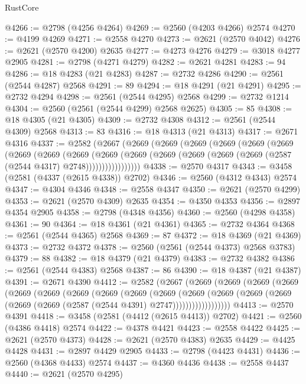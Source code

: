 \begin{lexlean}{RustCore}
\begin{coremodule}
@4266 := @2798 (@4256 @4264)
@4269 := @2560 (@4203 @4266) @2574
@4270 := @4199 @4269
@4271 := @2558 @4270
@4273 := @2621 (@2570 @4042)
@4276 := @2621 (@2570 @4200) @2635
@4277 := @4273 @4276
@4279 := @3018 @4277 @2905
@4281 := @2798 (@4271 @4279)
@4282 := @2621 @4281
@4283 := 94
@4286 := @18 @4283 (@21 @4283)
@4287 := @2732 @4286
@4290 := @2561 (@2544 @4287) @2568
@4291 := 89
@4294 := @18 @4291 (@21 @4291)
@4295 := @2732 @4294
@4298 := @2561 (@2544 @4295) @2568
@4299 := @2732 @1214
@4304 := @2560 (@2561 (@2544 @4299) @2568 @2625)
@4305 := 85
@4308 := @18 @4305 (@21 @4305)
@4309 := @2732 @4308
@4312 := @2561 (@2544 @4309) @2568
@4313 := 83
@4316 := @18 @4313 (@21 @4313)
@4317 := @2671 @4316
@4337 := @2582
    (@2667
      (@2669
        (@2669
          (@2669
            (@2669
              (@2669
                (@2669
                  (@2669
                    (@2669
                      (@2669
                        (@2669
                          (@2669
                            (@2669 (@2669 (@2669 (@2669 (@2587 (@2544 @4317) @2748)))))))))))))))))
@4338 := @2570 @4317
@4343 := @3458 (@2581 (@4337 (@2615 @4338)) @2702)
@4346 := @2560 (@4312 @4343) @2574
@4347 := @4304 @4346
@4348 := @2558 @4347
@4350 := @2621 (@2570 @4299)
@4353 := @2621 (@2570 @4309) @2635
@4354 := @4350 @4353
@4356 := @2897 @4354 @2905
@4358 := @2798 (@4348 @4356)
@4360 := @2560 (@4298 @4358)
@4361 := 90
@4364 := @18 @4361 (@21 @4361)
@4365 := @2732 @4364
@4368 := @2561 (@2544 @4365) @2568
@4369 := 87
@4372 := @18 @4369 (@21 @4369)
@4373 := @2732 @4372
@4378 := @2560 (@2561 (@2544 @4373) @2568 @3783)
@4379 := 88
@4382 := @18 @4379 (@21 @4379)
@4383 := @2732 @4382
@4386 := @2561 (@2544 @4383) @2568
@4387 := 86
@4390 := @18 @4387 (@21 @4387)
@4391 := @2671 @4390
@4412 := @2582
    (@2667
      (@2669
        (@2669
          (@2669
            (@2669
              (@2669
                (@2669
                  (@2669
                    (@2669
                      (@2669
                        (@2669
                          (@2669
                            (@2669
                              (@2669
                                (@2669 (@2669 (@2669 (@2587 (@2544 @4391) @2747))))))))))))))))))
@4413 := @2570 @4391
@4418 := @3458 (@2581 (@4412 (@2615 @4413)) @2702)
@4421 := @2560 (@4386 @4418) @2574
@4422 := @4378 @4421
@4423 := @2558 @4422
@4425 := @2621 (@2570 @4373)
@4428 := @2621 (@2570 @4383) @2635
@4429 := @4425 @4428
@4431 := @2897 @4429 @2905
@4433 := @2798 (@4423 @4431)
@4436 := @2560 (@4368 @4433) @2574
@4437 := @4360 @4436
@4438 := @2558 @4437
@4440 := @2621 (@2570 @4295)

\end{coremodule}
\end{lexlean}

